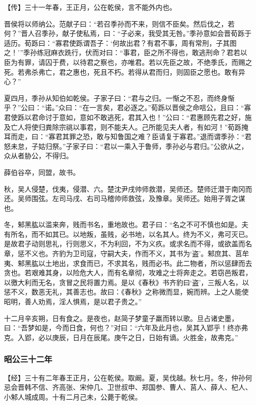 \documentclass[]{article}
\begin{document}
【传】三十一年春，王正月，公在乾侯，言不能外内也。

晋侯将以师纳公。范献子曰：``若召季孙而不来，则信不臣矣。然后伐之，若何？''晋人召季孙，献子使私焉，曰：``子必来，我受其无咎。''季孙意如会晋荀跞于适历。荀跞曰：``寡君使跞谓吾子：`何故出君？有君不事，周有常刑，子其图之！'''季孙练冠麻衣跣行，伏而对曰：``事君，臣之所不得也，敢逃刑命？君若以臣为有罪，请囚于费，以待君之察也，亦唯君。若以先臣之故，不绝季氏，而赐之死。若弗杀弗亡，君之惠也，死且不朽。若得从君而归，则固臣之愿也。敢有异心？''

夏四月，季孙从知伯如乾侯。子家子曰：``君与之归。一惭之不忍，而终身惭乎？''公曰：``诺。''众曰：``在一言矣，君必逐之。''荀跞以晋侯之命唁公，且曰：``寡君使跞以君命讨于意如，意如不敢逃死，君其入也！''公曰：``君惠顾先君之好，施及亡人将使归粪除宗祧以事君，则不能夫人。己所能见夫人者，有如河！''荀跞掩耳而走，曰：``寡君其罪之恐，敢与知鲁国之难？臣请复于寡君。''退而谓季孙：``君怒未怠，子姑归祭。''子家子曰：``君以一乘入于鲁师，季孙必与君归。''公欲从之，众从者胁公，不得归。

薛伯谷卒，同盟，故书。

秋，吴人侵楚，伐夷，侵潜、六。楚沈尹戌帅师救潜，吴师还。楚师迁潜于南冈而还。吴师围弦。左司马戌、右司马稽帅师救弦，及豫章。吴师还。始用子胥之谋也。

冬，邾黑肱以滥来奔，贱而书名，重地故也。君子曰：``名之不可不慎也如是。夫有所名，而不如其已。以地叛，虽贱，必书地，以名其人。终为不义，弗可灭已。是故君子动则思礼，行则思义，不为利回，不为义疚。或求名而不得，或欲盖而名章，惩不义也。齐豹为卫司寇，守嗣大夫，作而不义，其书为`盗'。邾庶其、莒牟夷、邾黑肱以土地出，求食而已，不求其名，贱而必书。此二物者，所以惩肆而去贪也。若艰难其身，以险危大人，而有名章彻，攻难之士将奔走之。若窃邑叛君，以徼大利而无名，贪冒之民将置力焉。是以《春秋》书齐豹曰`盗'，三叛人名，以惩不义，数恶无礼，其善志也。故曰：《春秋》之称微而显，婉而辨。上之人能使昭明，善人劝焉，淫人惧焉，是以君子贵之。''

十二月辛亥朔，日有食之。是夜也，赵简子梦童子羸而转以歌。旦占诸史墨，曰：``吾梦如是，今而日食，何也？''对曰：``六年及此月也，吴其入郢乎！终亦弗克。入郢，必以庚辰，日月在辰尾。庚午之日，日始有谪。火胜金，故弗克。''

\hypertarget{header-n2861}{%
\subsubsection{昭公三十二年}\label{header-n2861}}

【经】三十有二年春王正月，公在乾侯。取阚。夏，吴伐越。秋七月。冬，仲孙何忌会晋韩不信、齐高张、宋仲几、卫世叔申、郑国参、曹人、莒人、薛人、杞人、小邾人城成周。十有二月己未，公薨于乾侯。
\end{document}
